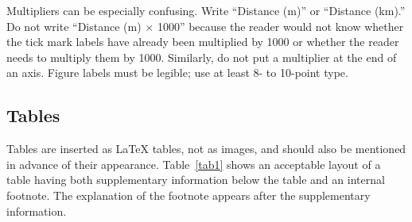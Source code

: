 \documentclass{IEEEtran}
\begin{document}
Multipliers can be especially confusing. Write ``Distance (m)'' or
``Distance (km).'' Do not write ``Distance (m) $\times$ 1000'' because the
reader would not know whether the tick mark labels have already been
multiplied by 1000 or whether the reader needs to multiply them by 1000.
Similarly, do not put a multiplier at the end of an axis. Figure labels must
be legible; use at least 8- to 10-point type.

\subsection{Tables}
Tables are inserted as {\LaTeX} tables, not as images, and should also be mentioned
in advance of their appearance. Table~\ref{tab1} shows an
acceptable layout of a table having both supplementary information below the
table and an internal footnote. The explanation of the footnote appears
after the supplementary information.
\end{document}
